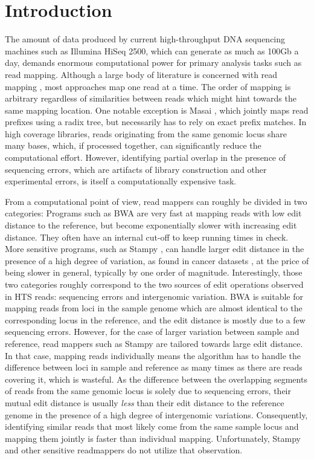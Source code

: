\documentclass[a4paper]{article}
\begin{document}
\section{Introduction}

The amount of data produced by current high-throughput DNA
sequencing machines such as Illumina HiSeq 2500, which can generate as much as 100Gb a day, demands enormous computational power for primary analysis tasks
such as read mapping.
Although a large body of literature is concerned with read mapping \cite{Li01082009, Li15072009, Langmead:2009fv, Rumble:2009jw, Hoffmann:2009hr, Hach:2010cd, Lunter2011, Hamada:2011bg, Weese:2012by, Mahmud:2012jn, Ahmadi01032012},
most approaches map one read at a time. The order of mapping is arbitrary regardless of similarities between reads which might hint towards the same mapping location. One notable exception is Masai \cite{Siragusa2013}, which jointly maps read prefixes using a radix tree, but necessarily has to rely on exact prefix matches.
In high coverage libraries, reads originating from the same genomic locus
share many bases, which, if processed together,
can significantly reduce the computational effort.
However, identifying partial overlap in the presence of sequencing errors,
which are artifacts of library construction and other experimental errors,
is itself a computationally expensive task.

From a computational point of view, read mappers  can  roughly be divided in two categories:
Programs such as BWA \cite{Li15072009} are very fast at mapping reads with low edit distance to the reference, but become exponentially slower with increasing edit distance. They often  have an internal cut-off to keep running times in check. More sensitive programs, such as Stampy \cite{Lunter2011}, can handle larger edit distance in the presence of a
high degree of variation, as found in cancer datasets \cite{Shah:2012cea}, at the price of being slower in general, typically by one order of magnitude.
Interestingly, those two categories roughly correspond to the two sources of edit operations observed in HTS reads: sequencing errors and intergenomic variation. BWA is suitable for mapping reads from loci in the sample genome which are almost identical to the corresponding locus in the reference, and the edit distance is mostly due to a few sequencing errors. However, for the case of larger variation between sample and reference, read mappers such as Stampy are tailored towards large edit distance. In that case, mapping reads individually means the algorithm has to handle the difference  between loci in sample and reference as many times as there are reads covering it, which is wasteful. As the difference between the overlapping segments of reads from the same
genomic locus is solely due to sequencing errors, their mutual edit distance
is usually {\em less} than their edit distance to the reference
genome in the presence of a high degree of intergenomic variations. Consequently, identifying similar reads that most likely come from the same sample locus and mapping them jointly is faster than individual mapping. Unfortunately, Stampy and other sensitive readmappers do not utilize that observation.
\end{document}

